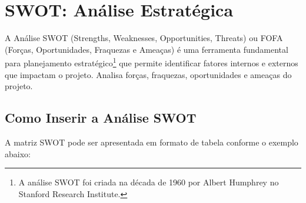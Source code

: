 \documentclass[11pt,a4paper]{article}
\begin{document}
\section{SWOT: Análise Estratégica}

A Análise SWOT (Strengths, Weaknesses, Opportunities, Threats) ou FOFA (Forças, Oportunidades, Fraquezas e Ameaças) \cite{oliveira2023} é uma ferramenta fundamental para planejamento estratégico\footnote{A análise SWOT foi criada na década de 1960 por Albert Humphrey no Stanford Research Institute.} que permite identificar fatores internos e externos que impactam o projeto. Analisa forças, fraquezas, oportunidades e ameaças do projeto.

\subsection{Como Inserir a Análise SWOT}

A matriz SWOT pode ser apresentada em formato de tabela conforme o exemplo abaixo:
\end{document}
